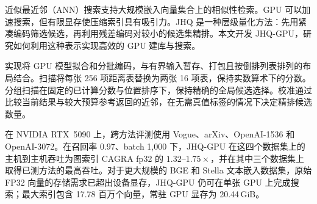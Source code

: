 近似最近邻（ANN）搜索支持大规模嵌入向量集合上的相似性检索。GPU 可以加速搜索，但有限显存使压缩索引具有吸引力。JHQ 是一种层级量化方法：先用紧凑编码筛选候选，再利用残差编码对较小的候选集精排。本文开发 JHQ-GPU，研究如何利用这种表示实现高效的 GPU 建库与搜索。

实现将 GPU 模型拟合和分批编码，与有界输入暂存、打包且按倒排列表排列的布局结合。扫描将每张 256 项距离表替换为两张 16 项表，保持实数算术下的分数。分组扫描在固定的已计算分数与位置排序下，保持精确的全局候选选择。校准通过比较当前结果与较大预算参考返回的近邻，在无需真值标签的情况下决定精排候选数量。

在 NVIDIA RTX~5090 上，跨方法评测使用 Vogue、arXiv、OpenAI-1536 和 OpenAI-3072。在召回率 0.97、batch 1,000 下，JHQ-GPU 在这四个数据集上的主机到主机吞吐为图索引 CAGRA fp32 的 $1.32$--$1.75\times$，并在其中三个数据集上取得已测方法的最高吞吐。对于更大规模的 BGE 和 Stella 文本嵌入数据集，原始 FP32 向量的存储需求已超出设备显存，JHQ-GPU 仍可在单张 GPU 上完成搜索；最大索引包含 17.78 百万个向量，常驻 GPU 显存为 20.44\,GiB。
